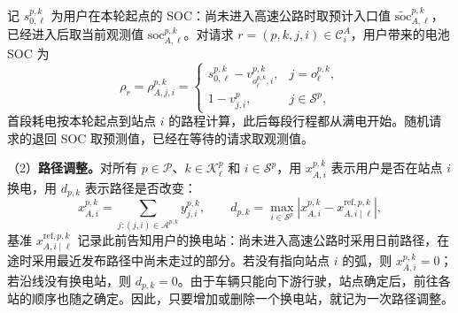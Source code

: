 \documentclass[12pt,a4paper,UTF8]{ctexart}
\begin{document}
记 $s_{0,\ell}^{p,k}$ 为用户在本轮起点的 SOC：尚未进入高速公路时取预计入口值 $\widetilde{\mathrm{soc}}_{A,\ell}^{p,k}$，已经进入后取当前观测值 $\mathrm{soc}_{A,\ell}^{p,k}$。对请求 $r=(p,k,j,i)\in\mathcal C_i^A$，用户带来的电池 SOC 为
\begin{equation}
\rho_r=\rho_{A,j,i}^{p,k}
=\begin{cases}
s_{0,\ell}^{p,k}-v_{o_\ell^{p,k},i}^{p,k},&j=o_\ell^{p,k},\\
1-v_{j,i}^{p},&j\in\mathcal S^p,
\end{cases}
\label{eq:return_soc}
\end{equation}
首段耗电按本轮起点到站点 $i$ 的路程计算，此后每段行程都从满电开始。随机请求的退回 SOC 取预测值，已经在等待的请求取观测值。

（2）\textbf{路径调整。}对所有 $p\in\mathcal P$、$k\in\mathcal K_\ell^p$ 和 $i\in\mathcal S^p$，用 $x_{A,i}^{p,k}$ 表示用户是否在站点 $i$ 换电，用 $d_{p,k}$ 表示路径是否改变：
\begin{equation}
x_{A,i}^{p,k}=\sum_{j:(j,i)\in\mathcal A^{p,k}}y_{j,i}^{p,k},
\qquad
d_{p,k}=\max_{i\in\mathcal S^p}
\left|x_{A,i}^{p,k}-x_{A,i\mid\ell}^{\mathrm{ref},p,k}\right|,
\label{eq:path_adjustment_indicator}
\end{equation}
基准 $x_{A,i\mid\ell}^{\mathrm{ref},p,k}$ 记录此前告知用户的换电站：尚未进入高速公路时采用日前路径，在途时采用最近发布路径中尚未走过的部分。若没有指向站点 $i$ 的弧，则 $x_{A,i}^{p,k}=0$；若沿线没有换电站，则 $d_{p,k}=0$。由于车辆只能向下游行驶，站点确定后，前往各站的顺序也随之确定。因此，只要增加或删除一个换电站，就记为一次路径调整。
\end{document}
